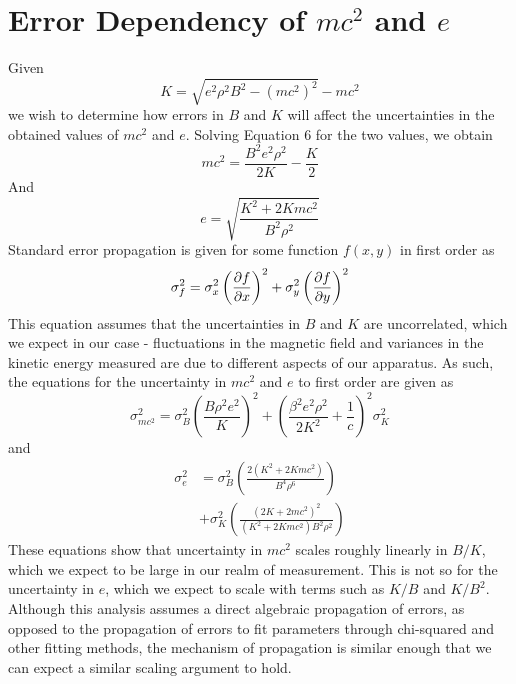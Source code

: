 \section{Error Dependency of $mc^2$ and $e$}
Given 
\begin{equation}
  K = \sqrt{e^2 \rho^2 B^2 - (mc^2)^2} - mc^2
\end{equation}
we wish to determine how errors in $B$ and $K$ will affect the uncertainties in the obtained values of $mc^2$ and $e$. Solving Equation 6 for the two values, we obtain
\begin{equation}
    mc^2 = \frac{B^2 e^2 \rho^2}{2K} - \frac{K}{2}
  \end{equation}
  And
  \begin{equation}
    e = \sqrt{\frac{K^2 + 2Kmc^2}{B^2 \rho^2}}
  \end{equation}
  Standard error propagation is given for some function $f(x,y)$ in first order as
  \begin{equation}
    \sigma_f^2 = \sigma_x^2 \left(\pdv{f}{x}\right)^2 + \sigma_y^2 \left(\pdv{f}{y}\right)^2
  \end{equation}
  This equation assumes that the uncertainties in $B$ and $K$ are uncorrelated, which we expect in our case - fluctuations in the magnetic field and variances in the kinetic energy measured are due to different aspects of our apparatus. As such, the equations for the uncertainty in $mc^2$ and $e$ to first order are given as
  \begin{equation}
    \sigma_{mc^2}^2 = \sigma_B^2 \left(\frac{B \rho^2 e^2}{K}\right)^2 + \left(\frac{\beta^2 e^2 \rho^2}{2K^2} + \frac{1}{c}\right)^2 \sigma_K^2 
  \end{equation}
  and
  \begin{equation}
    \begin{aligned}
    \sigma_e^2 &= \sigma_B^2 \left(\frac{2(K^2 + 2Kmc^2)}{B^4 \rho^6}\right) 
    \\
    &+ \sigma_K^2 \left(\frac{(2K + 2 mc^2)^2}{(K^2 + 2Kmc^2)B^2 \rho^2}\right)
  \end{aligned}
\end{equation}
These equations show that uncertainty in $mc^2$ scales roughly linearly in $B/K$, which we expect to be large in our realm of measurement. This is not so for the uncertainty in $e$, which we expect to scale with terms such as $K/B$ and $K/B^2$. Although this analysis assumes a direct algebraic propagation of errors, as opposed to the propagation of errors to fit parameters through chi-squared and other fitting methods, the mechanism of propagation is similar enough that we can expect a similar scaling argument to hold.







